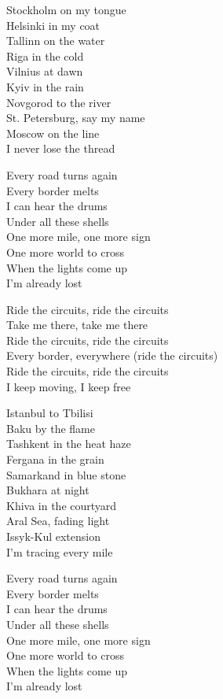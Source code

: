 \begin{lyrics}
Stockholm on my tongue\\
Helsinki in my coat\\
Tallinn on the water\\
Riga in the cold\\
Vilnius at dawn\\
Kyiv in the rain\\
Novgorod to the river\\
St. Petersburg, say my name\\
Moscow on the line\\
I never lose the thread

Every road turns again\\
Every border melts\\
I can hear the drums\\
Under all these shells\\
One more mile, one more sign\\
One more world to cross\\
When the lights come up\\
I’m already lost

Ride the circuits, ride the circuits\\
Take me there, take me there\\
Ride the circuits, ride the circuits\\
Every border, everywhere
(ride the circuits)\\
Ride the circuits, ride the circuits\\
I keep moving, I keep free

Istanbul to Tbilisi\\
Baku by the flame\\
Tashkent in the heat haze\\
Fergana in the grain\\
Samarkand in blue stone\\
Bukhara at night\\
Khiva in the courtyard\\
Aral Sea, fading light\\
Issyk-Kul extension\\
I’m tracing every mile

Every road turns again\\
Every border melts\\
I can hear the drums\\
Under all these shells\\
One more mile, one more sign\\
One more world to cross\\
When the lights come up\\
I’m already lost


\end{lyrics}

